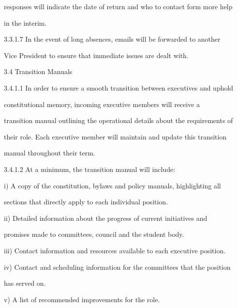          responses will indicate the date of return and who to contact form more help  

         in the interim.   

  

3.3.1.7           In  the  event  of  long  absences,  emails  will  be  forwarded  to  another  

         Vice President to ensure that immediate issues are dealt with.   

  

                                3.4      Transition Manuals   

  

3.4.1.1           In order to ensure a smooth transition between executives and uphold  

         constitutional         memory,        incoming        executive        members         will    receive      a  

         transition manual outlining the operational details about the requirements of  

         their role. Each executive member will maintain and update this transition  

         manual throughout their term.   

  

3.4.1.2           At a minimum, the transition manual will include:   

  

     i)       A copy of the constitution, bylaws and policy manuals, highlighting all  

              sections that directly apply to each individual position.   

  

     ii)      Detailed   information   about   the   progress   of   current   initiatives   and  

              promises made to committees, council and the student body.   

  

     iii)     Contact information and resources available to each executive position.   

  

     iv)      Contact and scheduling information for the committees that the position  

              has served on.   

  

    v)        A list of recommended improvements for the role.   

